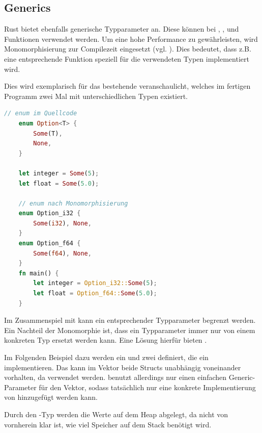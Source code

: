 \documentclass[11pt,a4paper, ngerman]{article}
\begin{document}
\subsection{Generics}
Rust bietet ebenfalls generische Typparameter an. Diese können bei , ,  und Funktionen verwendet werden. Um eine hohe Performance zu gewährleisten, wird Monomorphisierung zur Compilezeit eingesetzt (vgl. \cite[S. 196 ff.]{SK19}). Dies bedeutet, dass z.B. eine entsprechende Funktion speziell für die verwendeten Typen implementiert wird.

Dies wird exemplarisch für das bestehende   veranschaulicht, welches im fertigen Programm zwei Mal mit unterschiedlichen Typen existiert.

\begin{lstlisting}[language=rust, caption={Monomorphisierung Veranschaulichung \cite{MonoCodeEx}}]
    // enum im Quellcode
    enum Option<T> {
        Some(T),
        None,
    }

    let integer = Some(5);
    let float = Some(5.0);
    
    // enum nach Monomorphisierung
    enum Option_i32 {
        Some(i32), None,
    }
    enum Option_f64 {
        Some(f64), None,
    }
    fn main() {
        let integer = Option_i32::Some(5);
        let float = Option_f64::Some(5.0);
    }
\end{lstlisting}

Im Zusammenspiel mit  kann ein entsprechender Typparameter begrenzt werden. Ein Nachteil der Monomorphie ist, dass ein Typparameter immer nur von einem konkreten Typ ersetzt werden kann. Eine Lösung hierfür bieten .

Im Folgenden Beispiel dazu werden ein  und zwei  definiert, die ein  implementieren. Das  kann im Vektor  beide Structs unabhängig voneinander vorhalten, da  verwendet werden.  benutzt allerdings nur einen einfachen Generic-Parameter für den Vektor, sodass tatsächlich nur eine konkrete Implementierung von  hinzugefügt werden kann.

\label{sec:BoxType}
Durch den -Typ werden die Werte auf dem Heap abgelegt, da nicht von vornherein klar ist, wie viel Speicher auf dem Stack benötigt wird.
\end{document}
